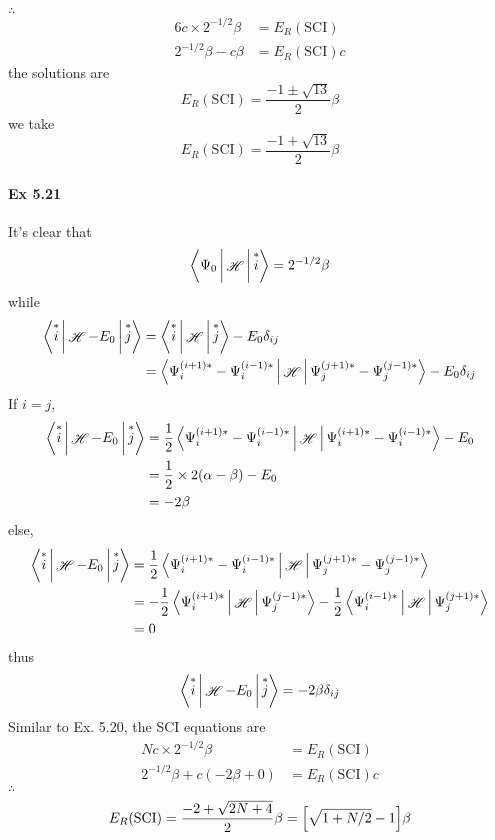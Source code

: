 \documentclass[a4paper]{article}
\DeclareMathOperator{\sH}{\mathscr{H}}
\newcommand{\ex}[1]{\paragraph{Ex #1}}
\numberwithin{equation}{subsection}
\begin{document}
$ \therefore $
\begin{align}
6c\times 2^{-1/2}\beta &= E_R(\text{SCI}) \\
2^{-1/2}\beta - c\beta &= E_R(\text{SCI}) c 
\end{align}
the solutions are
\begin{equation}\label{key}
E_R(\text{SCI}) = \dfrac{-1\pm\sqrt{13}}{2}\beta
\end{equation}
we take
\begin{equation}\label{key}
E_R(\text{SCI}) = \dfrac{-1+\sqrt{13}}{2}\beta
\end{equation}

\ex{5.21}
It's clear that
\begin{equation}\label{key}
\Braket{\Psi_0 | \sH |\overset{*}{i}} = 2^{-1/2}\beta
\end{equation}
while
\begin{align}
\Braket{\overset{*}{i} | \sH-E_0 | \overset{*}{j}} 
&= \Braket{\overset{*}{i} | \sH | \overset{*}{j}} - E_0\delta_{ij} \notag\\
&= \Braket{\Psi_i^{(i+1)*} - \Psi_i^{(i-1)*} | \sH | \Psi_j^{(j+1)*} - \Psi_j^{(j-1)*}} - E_0\delta_{ij} %
\end{align}
If $ i=j $,
\begin{align}
\Braket{\overset{*}{i} | \sH-E_0 | \overset{*}{j}} 
&= \dfrac{1}{2}\Braket{\Psi_i^{(i+1)*} - \Psi_i^{(i-1)*} | \sH | \Psi_i^{(i+1)*} - \Psi_i^{(i-1)*}} - E_0 \notag\\
&= \dfrac{1}{2}\times 2 (\alpha-\beta) - E_0 \notag\\
&= -2\beta
\end{align}
else,
\begin{align}
\Braket{\overset{*}{i} | \sH-E_0 | \overset{*}{j}} 
&= \dfrac{1}{2}\Braket{\Psi_i^{(i+1)*} - \Psi_i^{(i-1)*} | \sH | \Psi_j^{(j+1)*} - \Psi_j^{(j-1)*}} \notag\\
&= - \dfrac{1}{2}\Braket{\Psi_i^{(i+1)*} | \sH |  \Psi_j^{(j-1)*}} 
- \dfrac{1}{2}\Braket{\Psi_i^{(i-1)*} | \sH |  \Psi_j^{(j+1)*}} \notag\\
&= 0
\end{align}
thus
\begin{equation}\label{key}
\Braket{\overset{*}{i} | \sH-E_0 | \overset{*}{j}} = -2\beta \delta_{ij}
\end{equation}
Similar to Ex. 5.20, the SCI equations are
\begin{align}
Nc\times 2^{-1/2}\beta &= E_R(\text{SCI}) \\
2^{-1/2}\beta + c(-2\beta + 0) &= E_R(\text{SCI})c
\end{align}
$ \therefore $
\begin{equation}\label{key}
E_R(\text{SCI}) = \dfrac{-2 + \sqrt{2N + 4}}{2}\beta 
= \qty[\sqrt{1+N/2} - 1] \beta
\end{equation}
\end{document}
